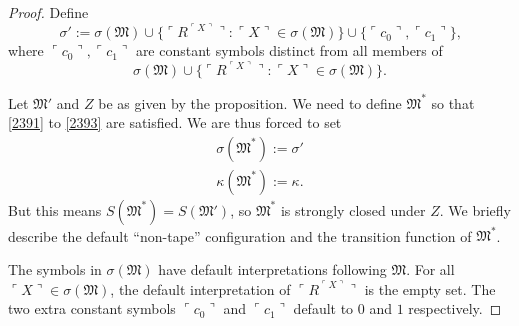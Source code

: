 \documentclass[12pt, twoside]{memoir}
\numberwithin{equation}{section}
\theoremstyle{definition}
\theoremstyle{remark}
\theoremstyle{definition}
\theoremstyle{definition}
\theoremstyle{definition}
\theoremstyle{remark}
\begin{document}
\begin{proof}
Define 
\begin{equation*}
    \sigma' := \sigma(\mathfrak{M}) \cup \{\ulcorner R^{\ulcorner X \urcorner} \urcorner : \ulcorner X \urcorner \in \sigma(\mathfrak{M})\} \cup \{\ulcorner c_0 \urcorner, \ulcorner c_1 \urcorner\} \text{,}
\end{equation*}
where $\ulcorner c_0 \urcorner, \ulcorner c_1 \urcorner$ are constant symbols distinct from all members of
\begin{equation*}
    \sigma(\mathfrak{M}) \cup \{\ulcorner R^{\ulcorner X \urcorner} \urcorner : \ulcorner X \urcorner \in \sigma(\mathfrak{M})\} \text{.}
\end{equation*}

Let $\mathfrak{M}'$ and $Z$ be as given by the proposition. We need to define $\mathfrak{M}^*$ so that \ref{2391} to \ref{2393} are satisfied. We are thus forced to set 
\begin{gather*}
    \sigma(\mathfrak{M}^*) := \sigma' \\
    \kappa(\mathfrak{M}^*) := \kappa \text{.}
\end{gather*}
But this means $S(\mathfrak{M}^*) = S(\mathfrak{M}')$, so $\mathfrak{M}^*$ is strongly closed under $Z$. We briefly describe the default ``non-tape'' configuration and the transition function of $\mathfrak{M}^*$. 

The symbols in $\sigma(\mathfrak{M})$ have default interpretations following $\mathfrak{M}$. For all $\ulcorner X \urcorner \in \sigma(\mathfrak{M})$, the default interpretation of $\ulcorner R^{\ulcorner X \urcorner} \urcorner$ is the empty set. The two extra constant symbols $\ulcorner c_0 \urcorner$ and $\ulcorner c_1 \urcorner$ default to $0$ and $1$ respectively. 


\end{proof}
\end{document}
